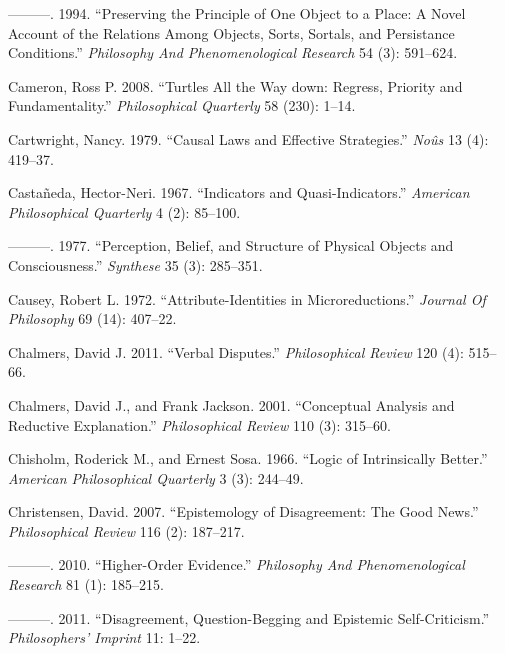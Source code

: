 \documentclass[
  10pt,
  letterpaper,
  DIV=11,
  numbers=noendperiod,
  twoside]{scrartcl}
\newlength{\cslhangindent}
\newenvironment{CSLReferences}[2] %
 {\begin{list}{}{%
  \setlength{\itemindent}{0pt}
  \setlength{\leftmargin}{0pt}
  \setlength{\parsep}{0pt}
  \ifodd #1
   \setlength{\leftmargin}{\cslhangindent}
   \setlength{\itemindent}{-1\cslhangindent}
  \fi
  \setlength{\itemsep}{#2\baselineskip}}}
 {\end{list}}
\begin{document}
\begin{CSLReferences}{1}{0}
---------. 1994. {``Preserving the Principle of One Object to a Place: A
Novel Account of the Relations Among Objects, Sorts, Sortals, and
Persistance Conditions.''} \emph{Philosophy And Phenomenological
Research} 54 (3): 591--624.

Cameron, Ross P. 2008. {``Turtles All the Way down: Regress, Priority
and Fundamentality.''} \emph{Philosophical Quarterly} 58 (230): 1--14.

Cartwright, Nancy. 1979. {``Causal Laws and Effective Strategies.''}
\emph{Noûs} 13 (4): 419--37.

Castañeda, Hector-Neri. 1967. {``Indicators and Quasi-Indicators.''}
\emph{American Philosophical Quarterly} 4 (2): 85--100.

---------. 1977. {``Perception, Belief, and Structure of Physical
Objects and Consciousness.''} \emph{Synthese} 35 (3): 285--351.

Causey, Robert L. 1972. {``Attribute-Identities in Microreductions.''}
\emph{Journal Of Philosophy} 69 (14): 407--22.

Chalmers, David J. 2011. {``Verbal Disputes.''} \emph{Philosophical
Review} 120 (4): 515--66.

Chalmers, David J., and Frank Jackson. 2001. {``Conceptual Analysis and
Reductive Explanation.''} \emph{Philosophical Review} 110 (3): 315--60.

Chisholm, Roderick M., and Ernest Sosa. 1966. {``Logic of Intrinsically
Better.''} \emph{American Philosophical Quarterly} 3 (3): 244--49.

Christensen, David. 2007. {``Epistemology of Disagreement: The Good
News.''} \emph{Philosophical Review} 116 (2): 187--217.

---------. 2010. {``Higher-Order Evidence.''} \emph{Philosophy And
Phenomenological Research} 81 (1): 185--215.

---------. 2011. {``Disagreement, Question-Begging and Epistemic
Self-Criticism.''} \emph{Philosophers' Imprint} 11: 1--22.


\end{CSLReferences}
\end{document}
